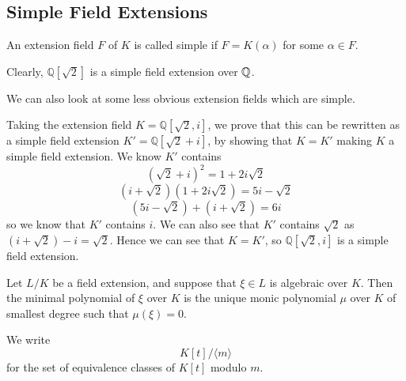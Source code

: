 \subsection{Simple Field Extensions}
\begin{definition}
An extension field \(F\) of \(K\) is called simple if \(F = K(\alpha)\) for some \(\alpha \in F\).
\end{definition}
\begin{example}
Clearly, \(\mathbb{Q}[\sqrt{2}]\) is a simple field extension over \(\mathbb Q\).
\end{example}
We can also look at some less obvious extension fields which are simple.
\begin{example}
Taking the extension field \(K = \mathbb{Q}[\sqrt{2}, i]\), we prove that this can be rewritten as a simple field extension \(K' = \mathbb{Q}[\sqrt{2} + i]\), by showing that \(K=K'\) making \(K\) a simple field extension. We know \(K'\) contains
\[(\sqrt{2} + i)^2 = 1 + 2i\sqrt{2}\]
\[(i + \sqrt{2})(1+2i\sqrt{2}) = 5i - \sqrt{2}\]
\[(5i - \sqrt{2}) + (i + \sqrt{2}) = 6i\]
so we know that \(K'\) contains \(i\). We can also see that \(K'\) contains \(\sqrt{2}\) as \((i+\sqrt{2})-i = \sqrt{2}\). Hence we can see that \(K = K'\), so \(\mathbb{Q}[\sqrt{2},i]\) is a simple field extension.
\end{example}


\begin{definition}
    Let $L / K$ be a field extension, and suppose that $\xi \in L$ is algebraic over $K$. Then the minimal polynomial of $\xi$ over $K$ is the unique monic polynomial $\mu$ over $K$ of smallest degree such that $\mu(\xi)=0$.


We write
$$
K[t] /\langle m\rangle
$$
for the set of equivalence classes of $K[t]$ modulo $m$. 
\end{definition}


